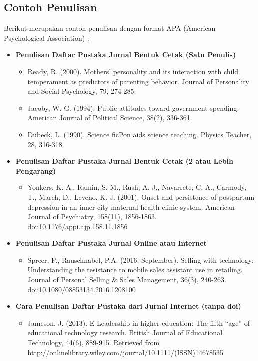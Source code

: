 \documentclass{article}
\begin{document}
\subsection{Contoh Penulisan}
Berikut merupakan contoh penulisan dengan format APA (American Psychological Association) :
\begin{itemize}
    \item \textbf{Penulisan Daftar Pustaka Jurnal Bentuk Cetak (Satu Penulis)}
    \begin{itemize}
        \item Ready, R. (2000). Mothers’ personality and its interaction with child temperament as predictors of parenting behavior. Journal of Personality and Social Psychology, 79, 274-285.
        \item Jacoby, W. G. (1994). Public attitudes toward government spending. American Journal of Political Science, 38(2), 336-361.
        \item  Dubeck, L. (1990). Science ﬁcPon aids science teaching. Physics Teacher, 28, 316-318.
    \end{itemize}
    \item \textbf{Penulisan Daftar Pustaka Jurnal Bentuk Cetak (2 atau Lebih Pengarang)}
    \begin{itemize}
        \item Yonkers, K. A., Ramin, S. M., Rush, A. J., Navarrete, C. A., Carmody, T., March, D., Leveno, K. J. (2001). Onset and persistence of postpartum depression in an inner-city maternal health clinic system. American Journal of Psychiatry, 158(11), 1856-1863. doi:10.1176/appi.ajp.158.11.1856        
    \end{itemize}
    \item \textbf{Penulisan Daftar Pustaka Jurnal Online atau Internet}
    \begin{itemize}
        \item Spreer, P., Rauschnabel, P.A. (2016, September). Selling with technology: Understanding the resistance to mobile sales assistant use in retailing. Journal of Personal Selling \& Sales Management, 36(3), 240-263. doi:10.1080/08853134.2016.1208100        
    \end{itemize}
    \item \textbf{Cara Penulisan Daftar Pustaka dari Jurnal Internet (tanpa doi)}
    \begin{itemize}
        \item Jameson, J. (2013). E-Leadership in higher education: The ﬁfth “age” of educational technology research. British Journal of Educational Technology, 44(6), 889-915. Retrieved from http://onlinelibrary.wiley.com/journal/10.1111/(ISSN)14678535       
    \end{itemize}
\end{itemize}
\end{document}
